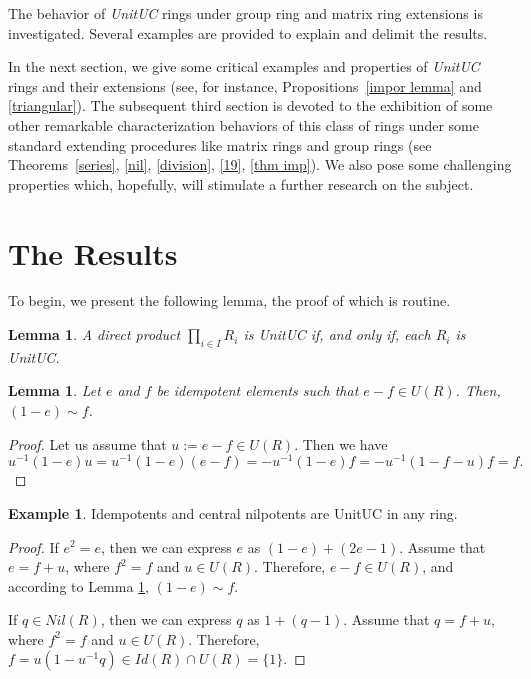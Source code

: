 \documentclass[12pt]{amsart}
\newtheorem{lemma}[theorem]{Lemma}
\theoremstyle{definition}
\newtheorem{example}[theorem]{Example}
\begin{document}
  The behavior of {\it UnitUC} rings under group ring and matrix ring extensions
is investigated. Several examples are provided to explain and delimit the results.\par
 

 In the next section, we give some critical examples and properties of {\it UnitUC} rings and their extensions (see, for instance, Propositions~\ref{impor lemma} and \ref{triangular}). The subsequent third section is devoted to the exhibition of some other remarkable characterization behaviors of this class of rings under some standard extending procedures like matrix rings and group rings (see Theorems~\ref{series}, \ref{nil}, \ref{division}, \ref{19}, \ref{thm imp}). We also pose some challenging properties which, hopefully, will stimulate a further research on the subject.
\section{The Results}
 
 To begin, we present the following lemma, the proof of which is routine.

\begin{lemma}\label{prod}
    A direct product $\prod_{i \in I}R_i$ is   UnitUC if, and only if, each $R_i$ is   UnitUC.
\end{lemma}

\begin{lemma} \label{first lemma}
    Let $e$ and $f$ be idempotent elements such that $e - f \in U(R)$. Then, $(1 - e) \sim f$.
\end{lemma}

\begin{proof}
Let us assume that $u := e - f \in U(R)$. Then we have
   $$u^{-1}(1-e)u= u^{-1}(1-e)(e - f)=-u^{-1}(1-e)f=-u^{-1}(1-f -u)f=f.$$
\end{proof}

\begin{example}
    Idempotents and central nilpotents are   UnitUC in any ring.
\end{example}
\begin{proof}
If $e^2 = e$, then we can express $e$ as $(1 - e) + (2e - 1)$. Assume that $e = f + u$, where $f^2 = f$ and $u \in U(R)$. Therefore, $e - f \in U(R)$, and according to Lemma \ref{first lemma}, $(1 - e) \sim f$.

If $q \in Nil(R)$, then we can express $q$ as $1 + (q-1)$. Assume that $q = f + u$, where $f^2 = f$ and $u \in U(R)$. Therefore, $f=u(1-u^{-1}q) \in Id(R) \cap U(R)=\{ 1 \}$.
\end{proof}
\end{document}
